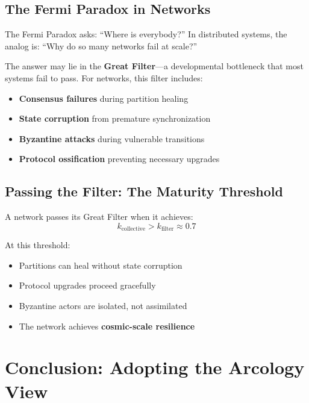 \documentclass[12pt,a4paper]{article}
\begin{document}
\subsection{The Fermi Paradox in Networks}

The Fermi Paradox asks: ``Where is everybody?'' In distributed systems, the analog is:
``Why do so many networks fail at scale?''

The answer may lie in the \textbf{Great Filter}---a developmental bottleneck that most
systems fail to pass. For networks, this filter includes:
\begin{itemize}
    \item \textbf{Consensus failures} during partition healing
    \item \textbf{State corruption} from premature synchronization
    \item \textbf{Byzantine attacks} during vulnerable transitions
    \item \textbf{Protocol ossification} preventing necessary upgrades
\end{itemize}

\subsection{Passing the Filter: The Maturity Threshold}

A network passes its Great Filter when it achieves:
\begin{equation}
k_{\text{collective}} > k_{\text{filter}} \approx 0.7
\end{equation}

At this threshold:
\begin{itemize}
    \item Partitions can heal without state corruption
    \item Protocol upgrades proceed gracefully
    \item Byzantine actors are isolated, not assimilated
    \item The network achieves \textbf{cosmic-scale resilience}
\end{itemize}

\section{Conclusion: Adopting the Arcology View}
\end{document}

